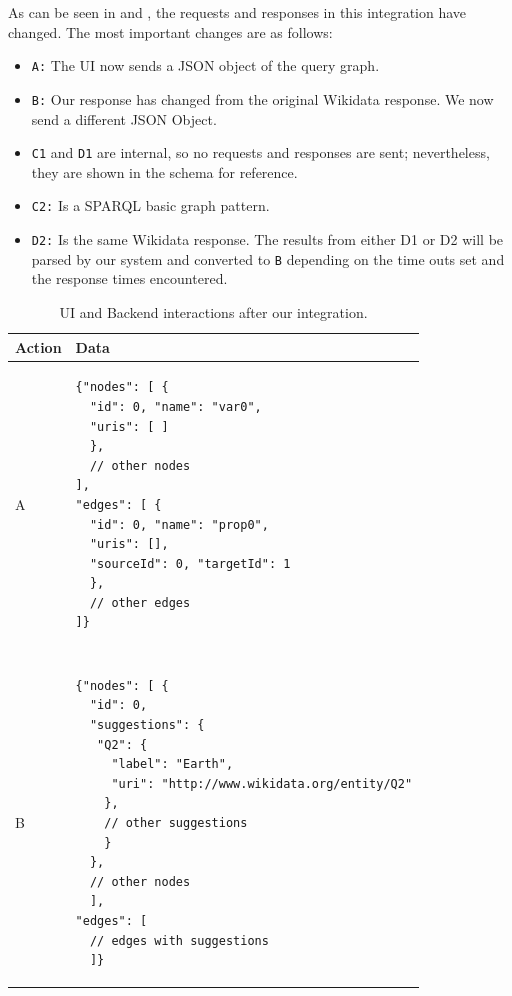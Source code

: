 As can be seen in  and , the requests and responses in this integration have changed. The most important changes are as follows:
\begin{itemize}
    \item \texttt{A:} The UI now sends a JSON object of the query graph.
    \item \texttt{B:} Our response has changed from the original Wikidata response. We now send a different JSON Object.
    \item \texttt{C1} and \texttt{D1} are internal, so no requests and responses are sent; nevertheless, they are shown in the schema for reference.
    \item \texttt{C2:} Is a SPARQL basic graph pattern.
    \item \texttt{D2:} Is the same Wikidata response. The results from either D1 or D2 will be parsed by our system and converted to \texttt{B} depending on the time outs set and the response times encountered.
\end{itemize}
 
\begin{table}[h]
\centering
\begin{tabular}{ll}
Action & Data \\ 
\hline
A              
& \begin{minipage}[t]{0.85\linewidth}
\begin{verbatim}
{"nodes": [ {
  "id": 0, "name": "var0",
  "uris": [ ]
  },
  // other nodes
],
"edges": [ {
  "id": 0, "name": "prop0",
  "uris": [],
  "sourceId": 0, "targetId": 1
  },
  // other edges
]}
\end{verbatim}
\end{minipage}
\\ \\ \\
B             
& \begin{minipage}[t]{0.85\linewidth}
\begin{verbatim}
{"nodes": [ {
  "id": 0, 
  "suggestions": {
   "Q2": {
     "label": "Earth",
     "uri": "http://www.wikidata.org/entity/Q2"
    }, 
    // other suggestions
    } 
  },
  // other nodes
  ], 
"edges": [ 
  // edges with suggestions
  ]}
\end{verbatim}
\end{minipage}
\\
\end{tabular}
\caption{UI and Backend interactions after our integration.}
\label{table:uiAfterRequest1}
\end{table}


